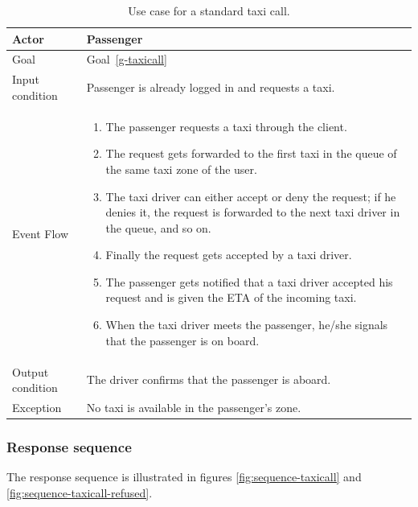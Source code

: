 \begin{table}
\begin{center}
\begin{tabular}{| l | p{} |}
\hline
Actor & Passenger \\
\hline
Goal & Goal~\ref{g-taxicall}
\\
\hline
Input condition & Passenger is already logged in and requests a taxi.  \\
\hline
Event Flow & \begin{enumerate}
	\item The passenger requests a taxi through the client.
	\item The request gets forwarded to the first taxi in the queue of the same taxi zone of the user.
	\item The taxi driver can either accept or deny the request; if he denies it, the request is forwarded to the next taxi driver in the queue, and so on.
	\item Finally the request gets accepted by a taxi driver.
	\item The passenger gets notified that a taxi driver accepted his request and is given the ETA of the incoming taxi.
	\item When the taxi driver meets the passenger, he/she signals that the passenger is on board.
\end{enumerate}
\\
\hline
Output condition & The driver confirms that the passenger is aboard. \\
\hline
Exception & No taxi is available in the passenger's zone. \\
\hline
\end{tabular}
\end{center}
\caption{Use case for a standard taxi call.}
\label{usecase-taxicall}
\end{table}

\subsubsection{Response sequence}
The response sequence is illustrated in figures \ref{fig:sequence-taxicall} and \ref{fig:sequence-taxicall-refused}.

